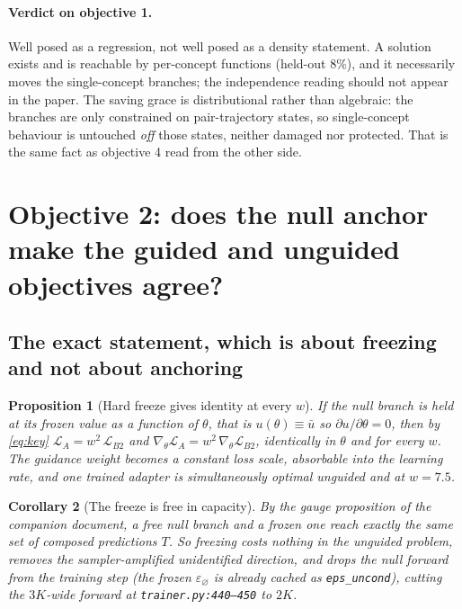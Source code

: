 \documentclass[11pt]{article}
\newcommand{\eps}{\varepsilon}
\newcommand{\cnull}{\varnothing}
\theoremstyle{plain}
\newtheorem{proposition}{Proposition}
\newtheorem{corollary}[proposition]{Corollary}
\theoremstyle{remark}
\begin{document}
\paragraph{Verdict on objective 1.}
Well posed as a regression, not well posed as a density statement. A solution exists and is
reachable by per-concept functions (held-out $8\%$), and it necessarily moves the single-concept
branches; the independence reading should not appear in the paper. The saving grace is
distributional rather than algebraic: the branches are only constrained on pair-trajectory states,
so single-concept behaviour is untouched \emph{off} those states, neither damaged nor protected.
That is the same fact as objective 4 read from the other side.

\section{Objective 2: does the null anchor make the guided and unguided objectives agree?}

\subsection{The exact statement, which is about freezing and not about anchoring}

\begin{proposition}[Hard freeze gives identity at every $w$]
\label{prop:freeze}
If the null branch is held at its frozen value as a \emph{function} of $\theta$, that is
$u(\theta) \equiv \bar u$ so $\partial u/\partial\theta = 0$, then by \eqref{eq:key}
$\mathcal{L}_A = w^2\,\mathcal{L}_{B2}$ and $\nabla_\theta \mathcal{L}_A =
w^2\,\nabla_\theta \mathcal{L}_{B2}$, identically in $\theta$ and for every $w$. The guidance
weight becomes a constant loss scale, absorbable into the learning rate, and one trained adapter is
simultaneously optimal unguided and at $w = 7.5$.
\end{proposition}

\begin{corollary}[The freeze is free in capacity]
By the gauge proposition of the companion document, a free null branch and a frozen one reach
exactly the same set of composed predictions $T$. So freezing costs nothing in the unguided
problem, removes the sampler-amplified unidentified direction, and drops the null forward from the
training step (the frozen $\eps_\cnull$ is already cached as \texttt{eps\_uncond}), cutting the
$3K$-wide forward at \texttt{trainer.py:440--450} to $2K$.
\end{corollary}
\end{document}
